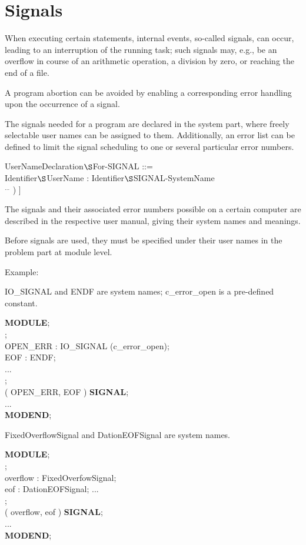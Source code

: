 \chapter{Signals}   %
\label{signals}

When executing certain statements, internal events, so-called signals,
can occur, leading to an interruption of the running task; such signals
may, e.g., be an overflow in course of an arithmetic operation, a
division by zero, or reaching the end of a file.

A program abortion can be avoided by enabling a corresponding error
handling upon the occurrence of a signal.

The signals needed for a program are declared in the system part, where
freely selectable user names can be assigned to them. Additionally, an
error list can be defined to limit the signal scheduling to one or
several particular error numbers.

UserNameDeclaration$\S $For-SIGNAL ::= \\
\x Identifier$\S $UserName : Identifier$\S $SIGNAL-SystemName\\
\x \x [ ( Identifier$\S $ErrorNumber [ , Identifier$\S $ErrorNumber ] $^{...}$ ) ]

The signals and their associated error numbers possible on a certain
computer are described in the respective user manual, giving their
system names and meanings.

Before signals are used, they must be specified under their user names
in the problem part at module level.

Example:

\begin{removed}
IO\_SIGNAL and ENDF are system names; c\_error\_open is a pre-defined
constant.

{\bf MODULE};\\
;\\
\x \x OPEN\_ERR : IO\_SIGNAL (c\_error\_open);\\
\x \x EOF : ENDF;\\
\x \x ...\\
;\\
\x {} ( OPEN\_ERR, EOF ) {\bf SIGNAL};\\
\x \x ... \\
{\bf MODEND};
\end{removed}
\begin{added}
FixedOverflowSignal and DationEOFSignal are system names.

{\bf MODULE};\\
;\\
\x \x overflow : FixedOverfowSignal;\\
\x \x eof : DationEOFSignal;
\x \x ...\\
;\\
\x {} ( overflow, eof ) {\bf SIGNAL};\\
\x \x ... \\
{\bf MODEND};
\end{added}

